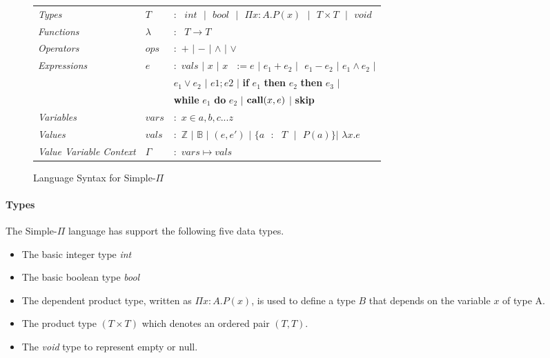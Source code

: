 \documentclass[a4paper,12pt]{report}
\begin{document}
\begin{figure}[H]
  \begin{center}
    \begin{tabular}{l l l}
      \textit{Types} & $T$ & $:\text{ }int\text{ }|\text{ }bool\text{ }|\text{ }\Pi x: A.P(x)
      \text{ }|\text{ }T \times T\text{ }|\text{ }void$\\
      \textit{Functions} & $\lambda$ & $:\text{ }T\longrightarrow T$\\
      \textit{Operators} & $ops$ & $:$ $+$ $|$ $-$ $|$ $\wedge$ $|$ $\vee$ \\
      \textit{Expressions} & $e$ & $:$ $vals$ $|$ $x$ $|$ $x\text{ }:= e$ $|$ 
      $e_1 + e_2$ $| \text{ }e_1 - e_2$ $|$ $e_1 \wedge e_2$ $|$ \\ 
      & & \; $e_1 \vee e_2$ $|$ $e1;e2$ $|$ \textbf{if} $e_1$ \textbf{then} $e_2$ \textbf{then} $e_3$ $|$\\
      & & \;  \textbf{while} $e_1$ \textbf{do} $e_2$ $|$ 
      $\text{\textbf{call}}(x, e)$ $|$ \textbf{skip}\\
      \textit{Variables} & $vars$& $:$ $x \in {a,b,c...z}$\\
      \textit{Values} & $vals$& $:$ $\mathbb{Z}$ $|$ $\mathbb{B}$ $|$ $(e, e')$ $|$ $\{a\text{ }:
      \text{ }T\text{ }|\text{ } P(a)\}$\text{ }$|$ $\lambda x.e$\\
      \textit{Value Variable Context} & $\Gamma$& $:$ $vars \mapsto vals$
    \end{tabular}
  \end{center}
  \caption{Language Syntax for Simple-$\Pi$}
\end{figure}

\paragraph{Types} The Simple-$\Pi$ language has support the following five data types. 
\begin{itemize}
  \item The basic integer type \textit{int}
  \item The basic boolean type \textit{bool}
  \item The dependent product type, written as $\Pi x: A.P(x)$, is used to 
  define a type $B$ that depends on the variable $x$ of type A.
  \item The product type $(T \times T)$ which denotes an ordered pair $(T, T)$.
  \item The \textit{void} type to represent empty or null.
\end{itemize}
\end{document}
